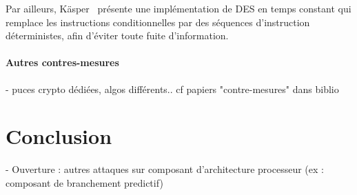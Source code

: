 \documentclass[a4paper,11pt]{article}
\begin{document}
Par ailleurs, Käsper~\cite{kasper2009faster} présente une implémentation de DES en temps constant qui remplace les instructions conditionnelles par des séquences d'instruction déterministes, afin d'éviter toute fuite d'information.

\paragraph{Autres contres-mesures}
- puces crypto dédiées, algos différents.. cf papiers "contre-mesures" dans biblio %


\section*{Conclusion}

- Ouverture : autres attaques sur composant d'architecture processeur (ex :
  composant de branchement predictif)

\newpage
\nocite{*}


\end{document}
